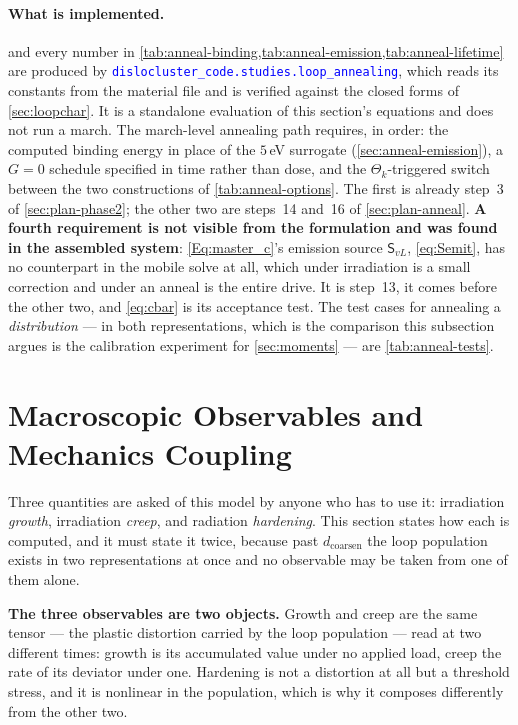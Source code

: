 \documentclass{article}
\newcommand{\textttclr}[1]{\textcolor{blue}{\texttt{#1}}}
\newcommand{\spvec}[1]{\bm{\mathsf{#1}}}   %
\begin{document}
\paragraph{What is implemented.}  and
every number in \cref{tab:anneal-binding,tab:anneal-emission,tab:anneal-lifetime}
are produced by \textttclr{dislocluster\_code.studies.loop\_annealing}, which
reads its constants from the material file and is verified against the closed
forms of \cref{sec:loopchar}. It is a standalone evaluation of this section's
equations and does not run a march. The march-level annealing path requires, in
order: the computed binding energy in place of the $5\,$eV surrogate
(\cref{sec:anneal-emission}), a $G=0$ schedule specified in time rather than
dose, and the $\Theta_k$-triggered switch between the two constructions of
\cref{tab:anneal-options}. The first is already step~3 of
\cref{sec:plan-phase2}; the other two are steps~14 and~16 of
\cref{sec:plan-anneal}. \textbf{A fourth requirement is not visible from the
formulation and was found in the assembled system}: \cref{Eq:master_c}'s emission
source $\spvec S_{vL}$, \cref{eq:Semit}, has no counterpart in the mobile solve at
all, which under irradiation is a small correction and under an anneal is the
entire drive. It is step~13, it comes before the other two, and
\cref{eq:cbar} is its acceptance test. The test cases for annealing a
\emph{distribution} --- in both representations, which is the comparison this
subsection argues is the calibration experiment for \cref{sec:moments} --- are
\cref{tab:anneal-tests}.

\section{Macroscopic Observables and Mechanics Coupling}
\label{sec:observables-mech}

Three quantities are asked of this model by anyone who has to use it: irradiation
\emph{growth}, irradiation \emph{creep}, and radiation \emph{hardening}. This
section states how each is computed, and it must state it twice, because past
$d_{\mathrm{coarsen}}$ the loop population exists in two representations at once
and no observable may be taken from one of them alone.

\textbf{The three observables are two objects.} Growth and creep are the same
tensor --- the plastic distortion carried by the loop population --- read at two
different times: growth is its accumulated value under no applied load, creep the
rate of its deviator under one. Hardening is not a distortion at all but a
threshold stress, and it is nonlinear in the population, which is why it composes
differently from the other two.
\end{document}
